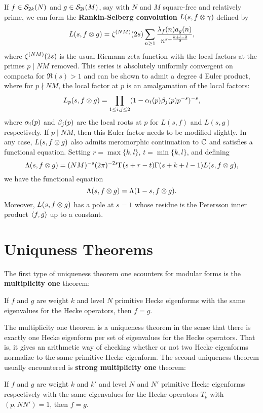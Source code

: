 \documentclass[12pt,reqno,oneside]{amsart}
\begin{document}
    If $f \in \mathcal{S}_{2k}(N)$ and $g \in \mathcal{S}_{2l}(M)$, say with $N$ and $M$ square-free and relatively prime, we can form the \textbf{Rankin-Selberg convolution} $L(s,f \otimes \gamma)$ defined by
    \[
        L(s,f \otimes g) = \zeta^{(NM)}(2s)\sum_{n \ge 1}\frac{\lambda_{f}(n)a_{g}(n)}{n^{s+\frac{k+l-2}{2}}},
    \]
    where $\zeta^{(NM)}(2s)$ is the usual Riemann zeta function with the local factors at the primes $p \mid NM$ removed. This series is absolutely uniformly convergent on compacta for $\Re(s) > 1$ and can be shown to admit a degree $4$ Euler product, where for $p \nmid NM$, the local factor at $p$ is an amalgamation of the local factors:
    \[
        L_{p}(s,f \otimes g) = \prod_{1 \le i,j \le 2}(1-\alpha_{i}(p)\beta_{j}(p)p^{-s})^{-s},
    \]
    where $\alpha_{i}(p)$ and $\beta_{j}(p)$ are the local roots at $p$ for $L(s,f)$ and $L(s,g)$ respectively. If $p \mid NM$, then this Euler factor needs to be modified slightly. In any case, $L(s,f \otimes g)$ also admits meromorphic continuation to $\mathbb{C}$ and satisfies a functional equation. Setting $r = \max\{k,l\}$, $t = \min\{k,l\}$, and defining
    \[
        \Lambda(s,f \otimes g) = (NM)^{-s}(2\pi)^{-2s}\Gamma(s+r-t)\Gamma(s+k+l-1)L(s,f \otimes g),
    \]
    we have the functional equation
    \[
        \Lambda(s,f \otimes g) = \Lambda(1-s,f \otimes g).
    \]
    Moreover, $L(s, f \otimes g)$ has a pole at $s = 1$ whose residue is the Petersson inner product $\langle f,g\rangle$ up to a constant.
\section{Uniquness Theorems}
    The first type of uniqueness theorem one ecounters for modular forms is the \textbf{multiplicity one} theorem:

    \begin{theorem}
        If $f$ and $g$ are weight $k$ and level $N$ primitive Hecke eigenforms with the same eigenvalues for the Hecke operators, then $f = g$.
    \end{theorem}

    The multiplicity one theorem is a uniqueness theorem in the sense that there is exactly one Hecke eigenform per set of eigenvalues for the Hecke operators. That is, it gives an arithmetic way of checking whether or not two Hecke eigenforms normalize to the same primitive Hecke eigenform. The second uniqueness theorem usually encountered is \textbf{strong multiplicity one} theorem:

    \begin{theorem}
        If $f$ and $g$ are weight $k$ and $k'$ and level $N$ and $N'$ primitive Hecke eigenforms respectively with the same eigenvalues for the Hecke operators $T_{p}$ with $(p,NN') = 1$, then $f = g$.
    \end{theorem}
\end{document}
